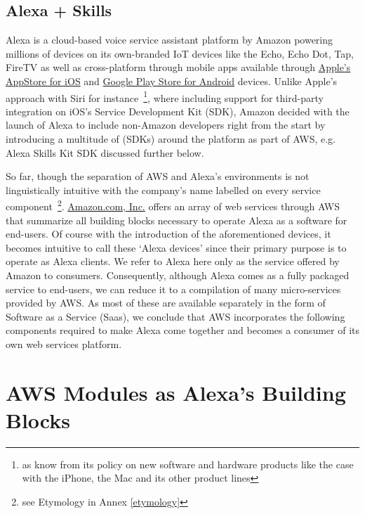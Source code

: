 \subsection*{Alexa + Skills}
\label{alexa:def}
Alexa is a cloud-based voice service assistant platform by Amazon powering millions of devices %
on its own-branded IoT devices like the Echo, Echo Dot, Tap, FireTV as well as cross-platform through mobile apps available through  \href{https://itunes.apple.com/de/app/amazon-alexa/id944011620?l=en&mt=8}{Apple's AppStore for iOS} and  \href{https://play.google.com/store/apps/details?id=com.amazon.dee.app&hl=en}{Google Play Store for Android} devices. Unlike Apple's approach with Siri for instance~\footnote{as know from its policy on  new software and hardware products like the case with the iPhone, the Mac and its other product lines}, where including support for third-party integration on iOS's Service Development Kit (SDK), Amazon decided with the launch of Alexa to include non-Amazon developers right from the start by introducing a multitude of (SDKs) around the platform as part of AWS, e.g. Alexa Skills Kit SDK discussed further below.

So far, though the separation of AWS and Alexa's environments is not linguistically intuitive with the company's name labelled on every service component~\footnote{see Etymology in Annex \ref{etymology}}. \href{http://www.amazon.com}{Amazon.com, Inc.} offers an array of web services through AWS that summarize all building blocks necessary to operate Alexa as a software for end-users. Of course with the introduction of the aforementioned devices, it becomes intuitive to call these `Alexa devices' since their primary purpose is to operate as Alexa clients. We refer to Alexa here only as the service offered by Amazon to consumers. Consequently, although Alexa comes as a fully packaged service to end-users, we can reduce it to a compilation of many micro-services provided by AWS. As most of these are available separately in the form of Software as a Service (Saas), we conclude that AWS incorporates the following components required to make Alexa come together and becomes a consumer of its own web services platform. 






\section{AWS Modules as Alexa's Building Blocks }
\label{aws:modules}

